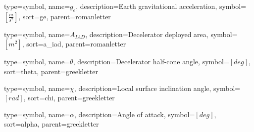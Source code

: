 {
type=symbol, %
name={\ensuremath{g_{e}}}, %
description={Earth gravitational acceleration}, %
symbol={$\left[\frac{m}{s^2} \right]$}, %
sort=ge, %
parent=romanletter %
}

{
type=symbol, %
name={\ensuremath{A_{IAD}}}, %
description={Decelerator deployed area}, %
symbol={$\left[m^2 \right]$}, %
sort=a_iad, %
parent=romanletter %
}

{
type=symbol, %
name={\ensuremath{\theta}}, %
description={Decelerator half-cone angle}, %
symbol={$\left[deg \right]$}, %
sort=theta, %
parent=greekletter %
}

{
	type=symbol, %
	name={\ensuremath{\chi}}, %
	description={Local surface inclination angle}, %
	symbol={$\left[rad \right]$}, %
	sort=chi, %
	parent=greekletter %
}

{
	type=symbol, %
	name={\ensuremath{\alpha}}, %
	description={Angle of attack}, %
	symbol={$\left[deg \right]$}, %
	sort=alpha, %
	parent=greekletter %
}

